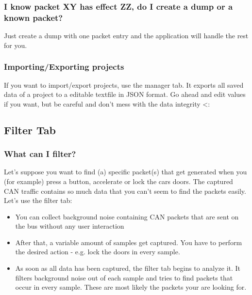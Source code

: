 \documentclass[letterpaper,10pt,english]{sphinxmanual}
\begin{document}
\subsubsection{I know packet XY has effect ZZ, do I create a dump or a known packet?}
\label{\detokenize{manual.managertab:i-know-packet-xy-has-effect-zz-do-i-create-a-dump-or-a-known-packet}}
Just create a dump with one packet entry and the application will
handle the rest for you.


\subsubsection{Importing/Exporting projects}
\label{\detokenize{manual.managertab:importing-exporting-projects}}
If you want to import/export projects, use the manager tab. It exports
all saved data of a project to a editable textfile in JSON format.
Go ahead and edit values if you want, but be careful and don’t mess
with the data integrity \textless{}:


\subsection{Filter Tab}
\label{\detokenize{manual.filtertab::doc}}\label{\detokenize{manual.filtertab:filter-tab}}

\subsubsection{What can I filter?}
\label{\detokenize{manual.filtertab:what-can-i-filter}}
Let’s suppose you want to find (a) specific packet(s) that get
generated when you (for example) press a button, accelerate or lock
the cars doors. The captured CAN traffic contains so much data that
you can’t seem to find the packets easily. Let’s use the filter tab:
\begin{itemize}
\item {} 
You can collect background noise containing CAN packets that
are sent on the bus without any user interaction

\item {} 
After that, a variable amount of samples get captured. You have to
perform the desired action  - e.g. lock the
doors in every sample.

\item {} 
As soon as all data has been captured, the filter tab begins to
analyze it. It filters background noise out of each sample and tries
to find packets that occur in every sample. These are most likely
the packets your are looking for.

\end{itemize}
\end{document}
